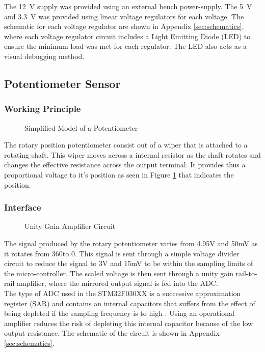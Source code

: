 The \SI{12}{V} supply was provided using an external bench power-supply. The \SI{5}{V} and \SI{3.3}{V} was provided using linear voltage regulators for each voltage. The schematic for each voltage regulator are shown in Appendix \ref{sec:schematics}, where each voltage regulator circuit includes a Light Emitting Diode (LED) to ensure the minimum load was met for each regulator. The LED also acts as a visual debugging method.

\subsection{Potentiometer Sensor}
\subsubsection{Working Principle}
\begin{figure}[h]
	\centering
	
	\caption{Simplified Model of a Potentiometer}
	\label{fig:potentiometer}
\end{figure}
The rotary position potentiometer consist out of a wiper that is attached to a rotating shaft. This wiper moves across a internal resistor as the shaft rotates and changes the effective resistance across the output terminal. It provides thus a proportional voltage to it's position as seen in Figure \ref{fig:potentiometer} that indicates the position.

\subsubsection{Interface}
\begin{figure}[h]
	\centering
	
	\caption{Unity Gain Amplifier Circuit}
	\label{fig:unitygain}
\end{figure}
The signal produced by the rotary potentiometer varies from 4.95V and 50mV as it rotates from 360\textdegree \space to 0\textdegree. This signal is sent through a simple voltage divider circuit to reduce the signal to 3V and 15mV to be within the sampling limits of the micro-controller. The scaled voltage is then sent through a unity gain rail-to-rail amplifier, where the mirrored output signal is fed into the ADC.\\

The type of ADC used in the STM32F030XX is a successive approximation register (SAR) and contains an internal capacitors that suffers from the effect of being depleted if the sampling frequency is to high \citep{stm32_ADC:2017}. Using an operational amplifier reduces the risk of depleting this internal capacitor because of the low output resistance. The schematic of the circuit is shown in Appendix \ref{sec:schematics}.\\


